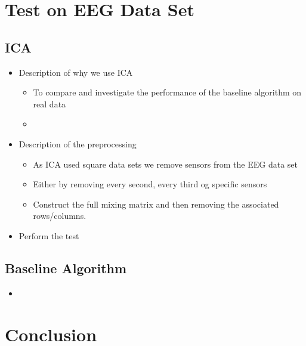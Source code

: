 \section{Test on EEG Data Set}

\subsection{ICA}
\begin{itemize}
\item Description of why we use ICA
	\begin{itemize}
	\item To compare and investigate the performance of the baseline algorithm on real data
	\item 
	\end{itemize}
\item Description of the preprocessing
	\begin{itemize}
	\item As ICA used square data sets we remove sensors from the EEG data set
	\item Either by removing every second, every third og specific sensors
	\item Construct the full mixing matrix and then removing the associated rows/columns.
	\end{itemize}
\item Perform the test
\end{itemize}

\subsection{Baseline Algorithm}
\begin{itemize}
\item 
\end{itemize}

\section{Conclusion}